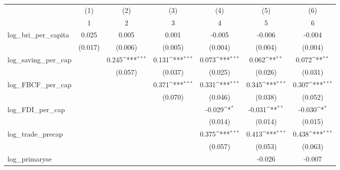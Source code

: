 {
\def\sym#1{\ifmmode^{#1}\else\(^{#1}\)\fi}
\begin{tabular}{l*{6}{c}}
\toprule
            &\multicolumn{1}{c}{(1)}&\multicolumn{1}{c}{(2)}&\multicolumn{1}{c}{(3)}&\multicolumn{1}{c}{(4)}&\multicolumn{1}{c}{(5)}&\multicolumn{1}{c}{(6)}\\
            &\multicolumn{1}{c}{1}&\multicolumn{1}{c}{2}&\multicolumn{1}{c}{3}&\multicolumn{1}{c}{4}&\multicolumn{1}{c}{5}&\multicolumn{1}{c}{6}\\
\midrule
log\_bri\_per\_capita&       0.025         &       0.005         &       0.001         &      -0.005         &      -0.006         &      -0.004         \\
            &     (0.017)         &     (0.006)         &     (0.005)         &     (0.004)         &     (0.004)         &     (0.004)         \\
\addlinespace
log\_saving\_per\_cap&                     &       0.245\sym{***}&       0.131\sym{***}&       0.073\sym{***}&       0.062\sym{**} &       0.072\sym{**} \\
            &                     &     (0.057)         &     (0.037)         &     (0.025)         &     (0.026)         &     (0.031)         \\
\addlinespace
log\_FBCF\_per\_cap&                     &                     &       0.371\sym{***}&       0.331\sym{***}&       0.345\sym{***}&       0.307\sym{***}\\
            &                     &                     &     (0.070)         &     (0.046)         &     (0.038)         &     (0.052)         \\
\addlinespace
log\_FDI\_per\_cap&                     &                     &                     &      -0.029\sym{*}  &      -0.031\sym{**} &      -0.030\sym{*}  \\
            &                     &                     &                     &     (0.014)         &     (0.014)         &     (0.015)         \\
\addlinespace
log\_trade\_precap&                     &                     &                     &       0.375\sym{***}&       0.413\sym{***}&       0.438\sym{***}\\
            &                     &                     &                     &     (0.057)         &     (0.053)         &     (0.063)         \\
\addlinespace
log\_primaryse&                     &                     &                     &                     &      -0.026         &      -0.007         \\

\end{tabular}}
